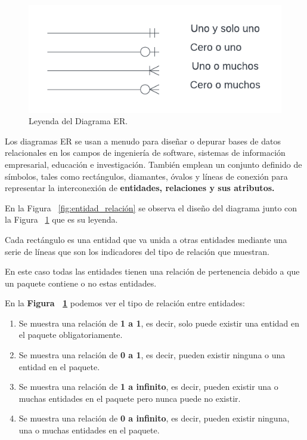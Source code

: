 \documentclass[a4paper, 12pt]{book}
\begin{document}
\begin{figure}
	\centering
	\includegraphics[width=17cm, keepaspectratio]{img/leyenda_diagrama.png}
	\caption{Leyenda del Diagrama ER.}
	\label{fig:leyenda_diagrama}
\end{figure}

Los diagramas ER se usan a menudo para diseñar o depurar bases de datos relacionales en los campos de ingeniería de software, sistemas de información empresarial, educación e investigación. También emplean un conjunto definido de símbolos, tales como rectángulos, diamantes, óvalos y líneas de conexión para representar la interconexión de \textbf {entidades, relaciones y sus atributos.}

En la Figura ~\ref{fig:entidad_relación} se observa el diseño del diagrama junto con la Figura ~\ref{fig:leyenda_diagrama} que es su leyenda.

Cada rectángulo es una entidad que va unida a otras entidades mediante una serie de líneas que son los indicadores del tipo de relación que muestran.

En este caso todas las entidades tienen una relación de pertenencia debido a que un paquete contiene o no estas entidades.

En la \textbf {Figura ~\ref{fig:leyenda_diagrama}} podemos ver el tipo de relación entre entidades:

\begin{enumerate}
\item Se muestra una relación de \textbf {1 a 1}, es decir, solo puede existir una entidad en el paquete obligatoriamente.

\item Se muestra una relación de \textbf {0 a 1}, es decir, pueden existir ninguna o una entidad en el paquete.

\item Se muestra una relación de \textbf {1 a infinito}, es decir, pueden existir una o muchas entidades en el paquete pero nunca puede no existir.

\item Se muestra una relación de \textbf {0 a infinito}, es decir, pueden existir ninguna, una o muchas entidades en el paquete.
\end{enumerate}
\end{document}
